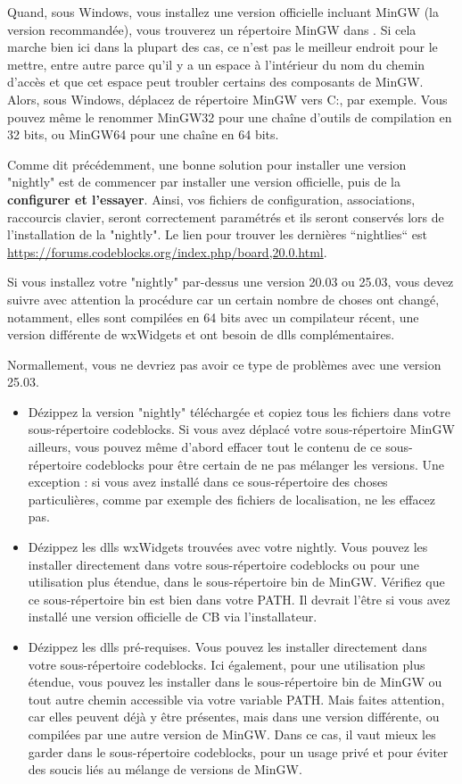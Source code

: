 Quand, sous Windows, vous installez une version officielle incluant MinGW (la version recommandée), vous trouverez un répertoire MinGW dans . Si cela marche bien ici dans la plupart des cas, ce n'est pas le meilleur endroit pour le mettre, entre autre parce qu'il y a un espace à l'intérieur du nom du chemin d'accès et que cet espace peut troubler certains des composants de MinGW. Alors, sous Windows, déplacez de répertoire MinGW vers C:, par exemple. Vous pouvez même le renommer MinGW32 pour une chaîne d'outils de compilation en 32 bits, ou MinGW64 pour une chaîne en 64 bits.

Comme dit précédemment, une bonne solution pour installer une version "nightly" est de commencer par installer une version officielle, puis de la \textbf{configurer et l'essayer}. Ainsi, vos fichiers de configuration, associations, raccourcis clavier, seront correctement paramétrés et ils seront conservés lors de l'installation de la "nightly". Le lien pour trouver les dernières “nightlies“ est \url{https://forums.codeblocks.org/index.php/board,20.0.html}.

Si vous installez votre "nightly" par-dessus une version 20.03 ou 25.03, vous devez suivre avec attention la procédure car un certain nombre de choses ont changé, notamment, elles sont compilées en 64 bits avec un compilateur récent, une version différente de wxWidgets et ont besoin de dlls complémentaires.

Normallement, vous ne devriez pas avoir ce type de problèmes avec une version 25.03.
\begin{itemize}
\item Dézippez la version "nightly" téléchargée et copiez tous les fichiers dans votre sous-répertoire codeblocks. Si vous avez déplacé votre sous-répertoire MinGW ailleurs, vous pouvez même d'abord effacer tout le contenu de ce sous-répertoire codeblocks pour être certain de ne pas mélanger les versions. Une exception : si vous avez installé dans ce sous-répertoire des choses particulières, comme par exemple des fichiers de localisation, ne les effacez pas.
\item Dézippez les dlls wxWidgets trouvées avec votre nightly. Vous pouvez les installer directement dans votre sous-répertoire codeblocks ou pour une utilisation plus étendue, dans le sous-répertoire bin de MinGW. Vérifiez que ce sous-répertoire bin est bien dans votre PATH. Il devrait l'être si vous avez installé une version officielle de CB via l'installateur.
\item Dézippez les dlls pré-requises. Vous pouvez les installer directement dans votre sous-répertoire codeblocks. Ici également, pour une utilisation plus étendue, vous pouvez les installer dans le sous-répertoire bin de MinGW ou tout autre chemin accessible via votre variable PATH. Mais faites attention, car elles peuvent déjà y être présentes, mais dans une version différente, ou compilées par une autre version de MinGW. Dans ce cas, il vaut mieux les garder dans le sous-répertoire codeblocks, pour un usage privé et pour éviter des soucis liés au mélange de versions de MinGW.
\end{itemize}

